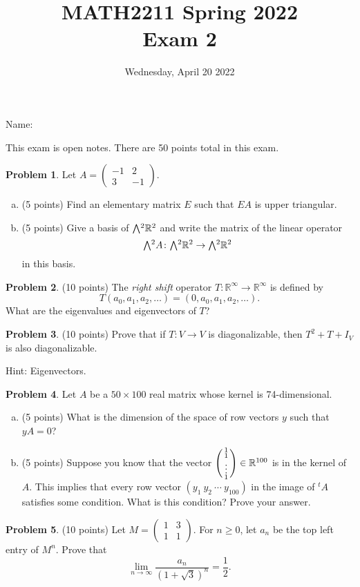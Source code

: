 \documentclass[11pt,oneside]{amsart}
\title{MATH2211 Spring 2022\\
Exam 2}
\author{Wednesday, April 20 2022}
\theoremstyle{definition}
\newtheorem{problem}{Problem}
\newcommand{\bR}{\mathbb{R}}
\newcommand*\colvec[1]{\begin{psmallmatrix}#1\end{psmallmatrix}}
\newcommand{\extp}{\mathchoice{{\textstyle\bigwedge}}%
    {{\bigwedge}}%
    {{\textstyle\wedge}}%
    {{\scriptstyle\wedge}}}
\begin{document}
    \maketitle

    Name: \underline{\hspace{6cm}}

    This exam is open notes. There are 50 points total in this exam.

    \begin{problem}
        Let $A=\begin{pmatrix}
            -1&2\\
            3&-1
        \end{pmatrix}$.
        \begin{enumerate}[(a)]
            \item (5 points) Find an elementary matrix $E$ such that $EA$ is upper triangular.
            \vfill
            \item (5 points) Give a basis of $\extp^2\bR^2$ and write the matrix of the linear operator
            \[\extp^2 A\colon \extp^2 \bR^2\to \extp^2\bR^2\]
            in this basis.
            \vfill
        \end{enumerate}
    \end{problem}
    \newpage

    \begin{problem}
       (10 points) The \emph{right shift} operator $T\colon \bR^\infty\to\bR^\infty$ is defined by
       \[T(a_0,a_1,a_2,\dots)=(0,a_0,a_1,a_2,\dots).\]
       What are the eigenvalues and eigenvectors of $T$?
    \end{problem}
    \newpage

    \begin{problem}
        (10 points) Prove that if $T\colon V\to V$ is diagonalizable, then $T^2+T+I_V$ is also diagonalizable.

        Hint: Eigenvectors.
    \end{problem}
    \vfill
    \newpage

    \begin{problem}
        Let $A$ be a $50\times 100$ real matrix whose kernel is 74-dimensional.
       \begin{enumerate}[(a)]
           \item (5 points) What is the dimension of the space of row vectors $y$ such that $yA=0$?
           \vfill
           \item (5 points) Suppose you know that the vector $\colvec{1\\1\\\vdots\\1}\in \bR^{100}$ is in the kernel of $A$. This implies that every row vector $(y_1\ y_2\ \cdots\ y_{100})$ in the image of $^tA$ satisfies some condition. What is this condition? Prove your answer.
           \vfill
       \end{enumerate}
    \end{problem}
    \newpage

    \begin{problem}
        (10 points) Let $M=\begin{pmatrix}
            1&3\\1&1
        \end{pmatrix}$.
        For $n\geq 0$, let $a_n$ be the top left entry of $M^n$. Prove that
        \[\lim_{n\to\infty}\frac{a_n}{(1+\sqrt3)^n}=\frac 12.\]
    \end{problem}
    \vfill
\end{document}
